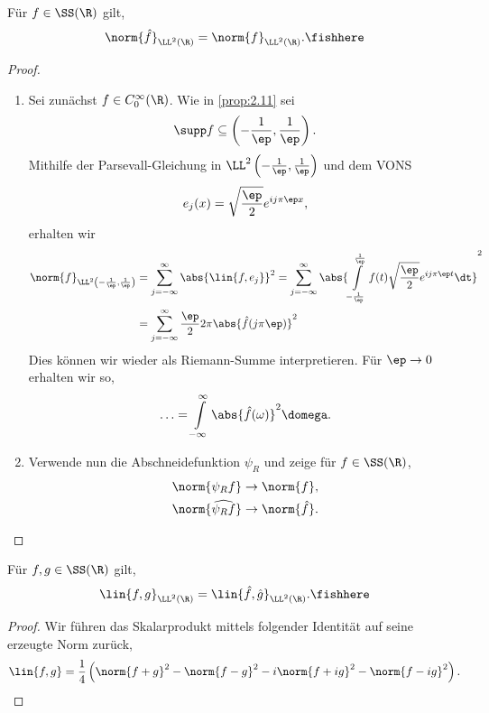 \begin{prop}
\label{prop:2.14}
Für $f\in\SS(\R)$ gilt,
\begin{align*}
\norm{\hat{f}}_{\LL^2(\R)} = \norm{f}_{\LL^2(\R)}.\fishhere
\end{align*}
\end{prop}
\begin{proof}
\begin{enumerate}[label=\arabic{*}.)]
  \item Sei zunächst $f\in C_0^\infty(\R)$. Wie in \ref{prop:2.11} sei 
\begin{align*}
\supp f \subseteq \left(-\frac{1}{\ep},\frac{1}{\ep}\right).
\end{align*}
Mithilfe der Parsevall-Gleichung in
$\LL^2\left(-\frac{1}{\ep},\frac{1}{\ep}\right)$ und dem  VONS
\begin{align*}
e_j(x) = \sqrt{\frac{\ep}{2}}e^{ij\pi\ep x},
\end{align*}
erhalten wir
\begin{align*}
\norm{f}_{\LL^2\left(-\frac{1}{\ep},\frac{1}{\ep}\right)} &= 
\sum\limits_{j=-\infty}^\infty \abs{\lin{f,e_j}}^2 = 
\sum\limits_{j=-\infty}^\infty \abs{\int\limits_{-\frac{1}{\ep}}^{\frac{1}{\ep}}
f(t)\sqrt{\frac{\ep}{2}}e^{ij\pi\ep t}\dt}^2\\
&= \sum\limits_{j=-\infty}^\infty
\frac{\ep}{2}2\pi\abs{\hat{f}(j\pi\ep)}^2 
\end{align*}
Dies können wir wieder als Riemann-Summe interpretieren. Für $\ep\to0$ erhalten
wir so,
\begin{align*}
\ldots = \int\limits_{-\infty}^\infty \abs{\hat{f}(\omega)}^2\domega.
\end{align*}
\item Verwende nun die Abschneidefunktion $\psi_R$ und zeige für $f\in\SS(\R)$, 
\begin{align*}
&\norm{\psi_R f} \to\norm{f},\\
&\norm{\widehat{\psi_R f}} \to\norm{\hat{f}}.\qedhere
\end{align*}
\end{enumerate}
\end{proof}

\begin{cor}
\label{prop:2.15}
Für $f,g\in\SS(\R)$ gilt,
\begin{align*}
\lin{f,g}_{\LL^2(\R)} = \lin{\hat{f},\hat{g}}_{\LL^2(\R)}.\fishhere
\end{align*}
\end{cor}
\begin{proof}
Wir führen das Skalarprodukt mittels folgender Identität auf seine erzeugte
Norm zurück,
\begin{align*}
\lin{f,g} = \frac{1}{4}\left(\norm{f+g}^2 - \norm{f-g}^2 - i\norm{f+ig}^2 -
\norm{f-ig}^2 \right).\qedhere
\end{align*}
\end{proof}

